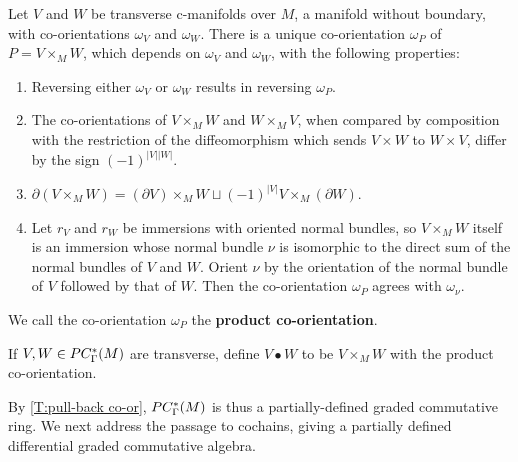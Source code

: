 \begin{theorem}\label{T:pull-back co-or}
	Let $V$ and $W$ be transverse c-manifolds over $M$, a manifold without boundary,
	with co-orientations $\omega_V$ and $\omega_W$.
	There is a unique co-orientation $\omega_P$ of $P = V \times_M W$, which depends on $\omega_V$ and $\omega_W$, with the following properties:
	\begin{enumerate}
		\item Reversing either $\omega_V$ or $\omega_W$ results in reversing $\omega_P$.
		\item The co-orientations of $V \times_M W$ and $W \times_M V$, when compared by composition with the restriction of the diffeomorphism which sends
		$V \times W$ to $W \times V$, differ by the sign $(-1)^{|V||W|}$.
		\item $\partial ( V \times_M W) = (\partial V) \times_M W \sqcup (-1)^{|V|} V \times_M (\partial W)$.
		\item Let $r_V$ and $r_W$ be immersions with oriented normal bundles, so $V \times_M W$ itself is an immersion whose
		normal bundle $\nu$ is isomorphic to the direct sum of the normal bundles of $V$ and $W$.
		Orient $\nu$ by the orientation of the normal bundle of $V$ followed by that of $W$.
		Then the co-orientation $\omega_P$ agrees with $\omega_{\nu}$.
	\end{enumerate}
\end{theorem}

We call the co-orientation $\omega_P$ the {\bf product co-orientation}.

\begin{definition}
	If $V, W \in PC_\Gamma^*(M)$ are transverse, define $V \bullet W$ to be $V \times_M W$ with the product co-orientation.
\end{definition}

By \cref{T:pull-back co-or}, $ PC_\Gamma^*(M)$ is thus a partially-defined graded commutative ring.
We next address the passage to cochains, giving a partially defined differential graded commutative algebra.

